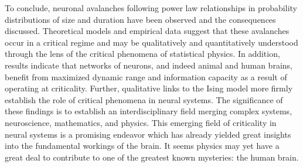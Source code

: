 \documentclass[12pt]{article}
\begin{document}
To conclude, neuronal avalanches following power law relationships in probability distributions of size and duration have been observed and the consequences discussed. Theoretical models and empirical data suggest that these avalanches occur in a critical regime and may be qualitatively and quantitatively understood through the lens of the critical phenomena of statistical physics. In addition, results indicate that networks of neurons, and indeed animal and human brains, benefit from maximized dynamic range and information capacity as a result of operating at criticality. Further, qualitative links to the Ising model more firmly establish the role of critical phenomena in neural systems. The significance of these findings is to establish an interdisciplinary field merging complex systems, neuroscience, mathematics, and physics. This emerging field of criticality in neural systems is a promising endeavor which has already yielded great insights into the fundamental workings of the brain. It seems physics may yet have a great deal to contribute to one of the greatest known mysteries: the human brain. 



{\small
}
\end{document}
